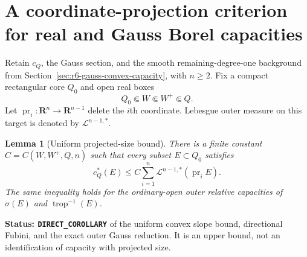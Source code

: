 \documentclass[11pt,a4paper]{article}
\numberwithin{equation}{section}
\newtheorem{lemma}[theorem]{Lemma}
\theoremstyle{definition}
\theoremstyle{remark}
\begin{document}


\section{A coordinate-projection criterion for real and Gauss Borel capacities}
\label{sec:r6-gauss-projection-C2}

Retain $c_Q$, the Gauss section, and the smooth remaining-degree-one
background from Section~\ref{sec:r6-gauss-convex-capacity}, with $n\ge2$.
Fix a compact rectangular core $Q_0$ and open real boxes
\[
                  Q_0\Subset W\Subset W^+\Subset Q.
\]
Let $\operatorname{pr}_i:\mathbf R^n\to\mathbf R^{n-1}$ delete
the $i$th coordinate. Lebesgue outer measure on this target is denoted
by $\mathcal L^{n-1,*}$.

\begin{lemma}[Uniform projected-size bound]
\label{lem:r6-gauss-projection-outer-bound}
There is a finite constant $C=C(W,W^+,Q,n)$ such that every subset
$E\subset Q_0$ satisfies
\[
        c_Q^*(E)\le C\sum_{i=1}^n
                          \mathcal L^{n-1,*}(\operatorname{pr}_i E).
\]
The same inequality holds for the ordinary-open outer relative
capacities of $\sigma(E)$ and $\operatorname{trop}^{-1}(E)$.
\end{lemma}

\noindent\textbf{Status: \texttt{DIRECT\_COROLLARY}} of the
uniform convex slope bound, directional Fubini, and the exact outer
Gauss reduction. It is an upper bound, not an identification of
capacity with projected size.
\end{document}
